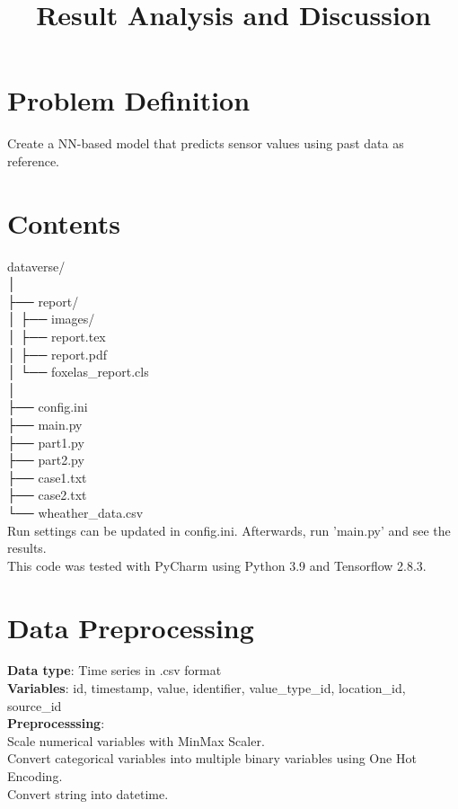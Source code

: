 \documentclass{foxelas_report}
\title{Result Analysis and Discussion}
\author{}
\date{}
\begin{document}
\maketitle



\section{Problem Definition}
Create a NN-based model that predicts sensor values using past data as reference. 

\section{Contents}
dataverse/\\
│\\
├── report/\\
│     ├── images/\\
│     ├── report.tex\\
│     ├── report.pdf\\
│     └── foxelas\_report.cls\\
│   \\
├── config.ini\\
├── main.py\\
├── part1.py\\
├── part2.py\\
├── case1.txt\\
├── case2.txt\\
└── wheather\_data.csv\\

Run settings can be updated in config.ini. Afterwards, run 'main.py' and see the results. \\
This code was tested with PyCharm using Python 3.9 and Tensorflow 2.8.3.


\section{Data Preprocessing}
\textbf{Data type}: Time series in .csv format\\
\textbf{Variables}: id, timestamp, value, identifier, value\_type\_id, location\_id, source\_id\\

\textbf{Preprocesssing}: \\
Scale numerical variables with MinMax Scaler.\\
Convert categorical variables into multiple binary variables using One Hot Encoding.\\
Convert string into datetime. \\
\end{document}
